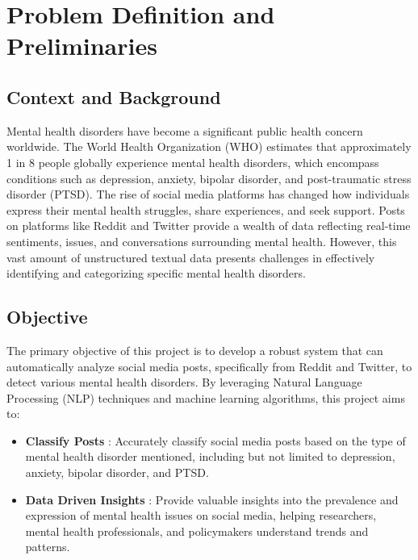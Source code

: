 \pagebreak
\section{Problem Definition and Preliminaries}

\begin{comment}
    State the problem you have solved. Define the boundaries of your project. What was included (scope) and what was not (exclusions)?
\vspace{.1in}

\noindent
Briefly explain the methods you used to conduct your research or complete the project. Were there specific tools, techniques or libraries employed?
\end{comment}

\subsection{Context and Background}
\noindent
Mental health disorders have become a significant public health concern worldwide. The World Health Organization (WHO) estimates that approximately 1 in 8 people globally experience mental health disorders, which encompass conditions such as depression, anxiety, bipolar disorder, and post-traumatic stress disorder (PTSD). The rise of social media platforms has changed how individuals express their mental health struggles, share experiences, and seek support. Posts on platforms like Reddit and Twitter provide a wealth of data reflecting real-time sentiments, issues, and conversations surrounding mental health. However, this vast amount of unstructured textual data presents challenges in effectively identifying and categorizing specific mental health disorders.

\subsection{Objective}
\noindent
The primary objective of this project is to develop a robust system that can automatically analyze social media posts, specifically from Reddit and Twitter, to detect various mental health disorders. By leveraging Natural Language Processing (NLP) techniques and machine learning algorithms, this project aims to:
\begin{itemize}
    \item \textbf{Classify Posts} :
    \noindent
    Accurately classify social media posts based on the type of mental health disorder mentioned, including but not limited to depression, anxiety, bipolar disorder, and PTSD.

    \item \textbf{Data Driven Insights} :
    \noindent
    Provide valuable insights into the prevalence and expression of mental health issues on social media, helping researchers, mental health professionals, and policymakers understand trends and patterns.
\end{itemize}

